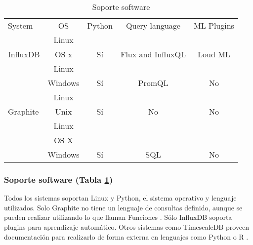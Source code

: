\begin{table}[H]
    \begin{center}
        \begin{adjustbox}{max width=\textwidth}
            \begin{tabular}{l c c c c}
                \toprule
                System & OS & Python & Query language & ML Plugins\\
                \otoprule
                & Linux &                       &  \\
                \multirow{-2}{*}{InfluxDB} & OS x  & \multirow{-2}{*}{Sí} & \multirow{-2}{*}{Flux and InfluxQL} & \multirow{-2}{*}{Loud ML} \\
                \rowcolor{gray!35}
                                            & Linux   &                        & & \\
                \rowcolor{gray!35}
                \multirow{-2}{*}{Prometheus} & Windows & \multirow{-2}{*}{Sí}  & \multirow{-2}{*}{PromQL} & \multirow{-2}{*}{No}\\
                                        & Linux &                       &  & \\
                \multirow{-2}{*}{Graphite} & Unix  & \multirow{-2}{*}{Sí}  & \multirow{-2}{*}{No} & \multirow{-2}{*}{No} \\
                \rowcolor{gray!35}
                                            & Linux   &                             & & \\
                \rowcolor{gray!35}
                                            & OS X    &                             & & \\
                \rowcolor{gray!35}
                \multirow{-3}{*}{TimescaleDB} & Windows & \multirow{-3}{*}{Sí} & \multirow{-3}{*}{SQL} & \multirow{-3}{*}{No} \\
                \bottomrule
            \end{tabular}
        \end{adjustbox}
        \caption{Soporte software}
        \label{tabla:sssgbd}
    \end{center}
\end{table}

\subsubsection{Soporte software (Tabla \ref*{tabla:sssgbd})} Todos los sistemas soportan Linux y Python, el sistema operativo 
y lenguaje utilizados. Solo Graphite no tiene un lenguaje de consultas definido, aunque se pueden realizar utilizando lo que 
llaman Funciones \cite{graphite-functions}. Sólo InfluxDB soporta plugins para aprendizaje automático. Otros sistemas como
TimescaleDB proveen documentación para realizarlo de forma externa en lenguajes como Python o R \cite{timescale-forecasting}.

